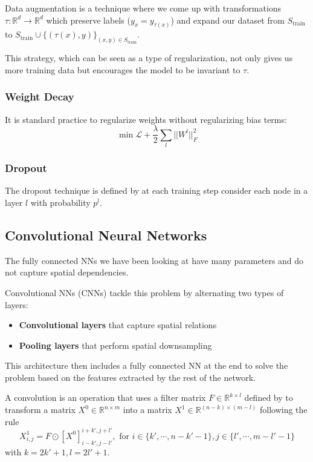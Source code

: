 \documentclass{article}
\newcommand{\R}{\mathbb{R}}
\newcommand{\loss}{\mathcal{L}}
\begin{document}
Data augmentation is a technique where we come up with transformations $\tau : \R^d \to \R^d$ which preserve labels ($y_x = y_{\tau(x)}$) and expand our dataset from $S_\text{train}$ to $S_\text{train} \cup \{ (\tau(x), y) \}_{(x,y) \in S_\text{train}}$.

This strategy, which can be seen as a type of regularization, not only gives us more training data but encourages the model to be invariant to $\tau$.

\subsubsection{Weight Decay}

It is standard practice to regularize weights without regularizing bias terms:
$$
\min \loss + \frac{\lambda}{2} \sum_l ||W^l||^2_F
$$

\subsubsection{Dropout}

The dropout technique is defined by at each training step consider each node in a layer $l$ with probability $p^l$.

\subsection{Convolutional Neural Networks}

The fully connected NNs we have been looking at have many parameters and do not capture spatial dependencies.

Convolutional NNs (CNNs) tackle this problem by alternating two types of layers:
\begin{itemize}
    \item \textbf{Convolutional layers} that capture spatial relations
    \item \textbf{Pooling layers} that perform spatial downsampling
\end{itemize}

This architecture then includes a fully connected NN at the end to solve the problem based on the features extracted by the rest of the network.

A convolution is an operation that uses a filter matrix $F \in \R^{k \times l}$ defined by to transform a matrix $X^0 \in \R^{n \times m}$ into a matrix $X^1 \in \R^{(n-k) \times (m-l)}$ following the rule
$$
X_{i,j}^1 = F \odot [X^0]_{i-k',j-l'}^{i+k',j+l'}, \text{ for } i \in \{k', \cdots, n-k'-1\}, j \in \{l', \cdots, m-l'-1\}
$$
with $k = 2k'+1, l=2l'+1$.
\end{document}
